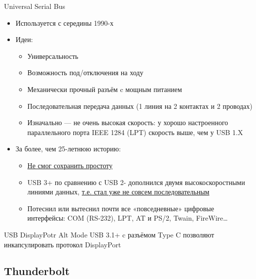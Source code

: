 \documentclass[xetex,aspectratio=43]{beamer}
\begin{document}
\begin{frame}{Universal Serial Bus}

\begin{itemize}
    \item Используется с середины 1990-х
    \item Идеи:
    \begin{itemize}
        \item Универсальность
        \item Возможность под/отключения на ходу
        \item Механически прочный разъём c мощным питанием
        \item \alert<2->{Последовательная передача данных (1 линия на 2 контактах и 2 проводах)}
        \item Изначально — не очень высокая скорость: у хорошо настроенного параллельного порта IEEE 1284 (LPT) скорость выше, чем у USB 1.X
    \end{itemize}
    \pause

    \item За более, чем 25-летнюю историю:
    \begin{itemize}
        \item \href{https://en.wikipedia.org/wiki/USB\#Connector_type_quick_reference}{Не смог сохранить простоту}
        \item \alert{USB 3+ по сравнению с USB 2- дополнился двумя высокоскоростными линиями данных}, \href{https://electronics.stackexchange.com/a/587798}{т.е. стал уже не совсем последовательным}
        \item Потеснил или вытеснил почти все «повседневные» цифровые интерфейсы: COM (RS-232), LPT, AT и PS/2, Twain, FireWire\ldots
    \end{itemize}
\end{itemize}

\end{frame}

\begin{frame}{USB DisplayPotr Alt Mode}
    USB 3.1+ c разъёмом Type C позволяют инкапсулировать протокол DisplayPort
\end{frame}

\subsection{Thunderbolt}
\end{document}

